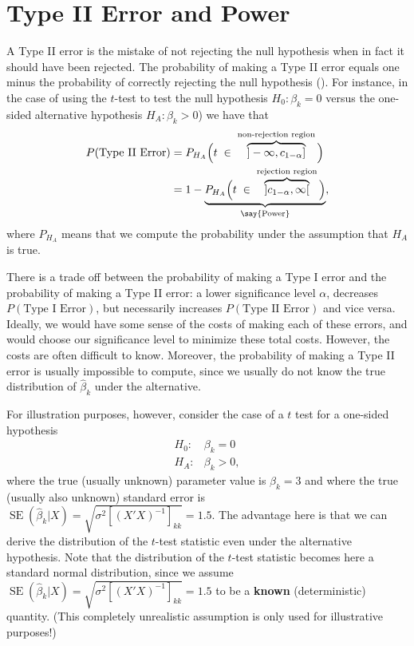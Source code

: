 \documentclass[
  14pt,
]{memoir}
\begin{document}
\hypertarget{type-ii-error-and-power}{%
\section{Type II Error and Power}\label{type-ii-error-and-power}}

A Type II error is the mistake of not rejecting the null hypothesis when in fact
it should have been rejected. The probability of making a Type II error equals one minus the probability of correctly rejecting the null hypothesis (). For instance, in the case of using the \(t\)-test to test the null hypothesis \(H_0: \beta_k=0\) versus the one-sided alternative hypothesis \(H_A:\beta_k>0\)) we have that
\begin{align*}
P(\text{Type II Error})
&=P_{H_A}\Big(t\;\in\;\overbrace{]-\infty,c_{1-\alpha}]}^{\text{non-rejection region}}\Big)\\
&=1-\underbrace{P_{H_A}\Big(t\;\in\;\overbrace{]c_{1-\alpha},\infty[}^{\text{rejection region}}\Big)}_{\text{\say{Power}}},
\end{align*}
where \(P_{H_A}\) means that we compute the probability under the assumption that \(H_A\) is true.

There is a trade off between the probability of making a Type I error and the probability of making a Type II error: a lower significance level \(\alpha\), decreases \(P(\text{Type I Error})\), but necessarily increases \(P(\text{Type II Error})\) and vice versa. Ideally, we would have some sense of the costs of making each of these errors, and would choose our significance level to minimize these total costs. However, the costs are often difficult to know. Moreover, the probability of making a Type II error is usually impossible to compute, since we usually do not know the true distribution of \(\hat\beta_k\) under the alternative.

For illustration purposes, however, consider the case of a \(t\) test for a one-sided hypothesis
\begin{equation*}
\begin{array}{ll}
H_0:  & \beta_k=0 \\
H_A:  & \beta_k>0,
\end{array}
\end{equation*}
where the true (usually unknown) parameter value is \(\beta_k=3\) and where the true (usually also unknown) standard error is \(\operatorname{SE}(\hat\beta_k|X)=\sqrt{\sigma^2[(X'X)^{-1}]_{kk}}=1.5\). The advantage here is that we can derive the distribution of the \(t\)-test statistic even under the alternative hypothesis. Note that the distribution of the \(t\)-test statistic becomes here a standard normal distribution, since we assume \(\operatorname{SE}(\hat\beta_k|X)=\sqrt{\sigma^2[(X'X)^{-1}]_{kk}}=1.5\) to be a \textbf{known} (deterministic) quantity. (This completely unrealistic assumption is only used for illustrative purposes!)
\end{document}
